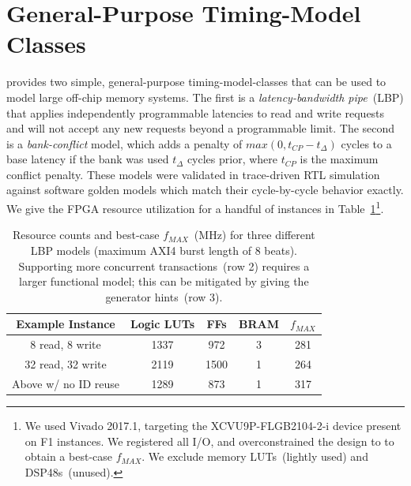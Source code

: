 
\section{General-Purpose Timing-Model Classes}\label{sec:timing_model}

\PNAME provides two simple, general-purpose timing-model-classes that can be used to
model large off-chip memory systems. The first is a \emph{latency-bandwidth
pipe}~(LBP) that applies independently programmable latencies to read and write
requests and will not accept any new requests beyond a programmable limit. The
second is a \emph{bank-conflict} model, which adds a penalty of $max(0, t_{CP} -
t_{\Delta})$ cycles to a base latency if the bank was used
$t_{\Delta}$ cycles prior, where $t_{CP}$ is the maximum conflict penalty.
These models were validated in trace-driven RTL simulation against
software golden models which match their cycle-by-cycle behavior exactly.  We
give the FPGA resource utilization for a handful of
instances in Table~\ref{tbl:lbp-model-resources}\footnote{We
used Vivado 2017.1, targeting the XCVU9P-FLGB2104-2-i device present on F1
instances. We registered all I/O, and overconstrained the design
to  to obtain a best-case $f_{MAX}$. We exclude memory
LUTs~(lightly used) and DSP48s~(unused).}.

\begin{table}[htb]
\centering
    \begin{tabular}{c c c c c }
	\hline
        \textbf{Example Instance} & Logic LUTs & FFs & BRAM & $f_{MAX}$ \\
	\hline
        8 read, 8 write & 1337 & 972 & 3 &  281 \\
        32 read, 32 write & 2119 & 1500 & 1 & 264 \\
        Above w/ no ID reuse & 1289 & 873 & 1 & 317 \\
	\hline
	\end{tabular}
    \caption{Resource counts and best-case $f_{MAX}$~(MHz) for three different
    LBP models (maximum AXI4 burst length of 8 beats). Supporting more concurrent transactions~(row 2) requires a larger
    functional model; this can be mitigated by giving the generator hints~(row 3).}
\label{tbl:lbp-model-resources}
\end{table}

